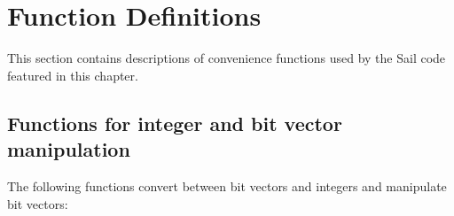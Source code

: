 \label{sailRISCVzcapzyhpermszywidth}
\sailRISCVtypecapHpermsWidth{}
\label{sailRISCVzcapzyupermszywidth}
\sailRISCVtypecapUpermsWidth{}
\label{sailRISCVzcapzyupermszyshift}
\sailRISCVtypecapUpermsShift{}
\label{sailRISCVzcapzyflagszywidth}
\sailRISCVtypecapFlagsWidth{}
\label{sailRISCVzcapzyotypezywidth}
\sailRISCVtypecapOtypeWidth{}

\label{sailRISCVzcapzymaxzyotype}
\sailRISCVletreservedOtypes{}
\sailRISCVletcapMaxOtype{}

\label{sailRISCVzcapszyperzycachezyline}
\sailRISCVtypecapsPerCacheLine{}

\section{Function Definitions}

This section contains descriptions of convenience functions used by the Sail code featured in this chapter.

\subsection*{Functions for integer and bit vector manipulation}

The following functions convert between bit vectors and integers and manipulate bit vectors:

\medskip
{}


\label{sailRISCVzEXTZ}

\label{sailRISCVzEXTS}

\label{sailRISCVzzzeros}

